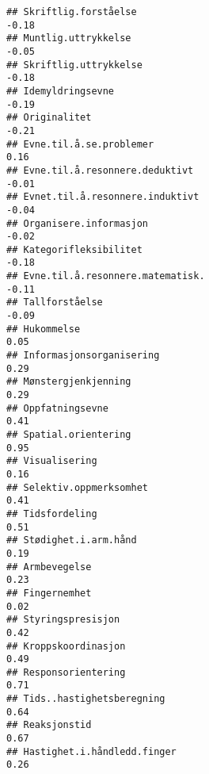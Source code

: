 \documentclass[
]{article}
\begin{document}
\begin{verbatim}
## Skriftlig.forståelse                                                             -0.18
## Muntlig.uttrykkelse                                                              -0.05
## Skriftlig.uttrykkelse                                                            -0.18
## Idemyldringsevne                                                                 -0.19
## Originalitet                                                                     -0.21
## Evne.til.å.se.problemer                                                           0.16
## Evne.til.å.resonnere.deduktivt                                                   -0.01
## Evnet.til.å.resonnere.induktivt                                                  -0.04
## Organisere.informasjon                                                           -0.02
## Kategorifleksibilitet                                                            -0.18
## Evne.til.å.resonnere.matematisk.                                                 -0.11
## Tallforståelse                                                                   -0.09
## Hukommelse                                                                        0.05
## Informasjonsorganisering                                                          0.29
## Mønstergjenkjenning                                                               0.29
## Oppfatningsevne                                                                   0.41
## Spatial.orientering                                                               0.95
## Visualisering                                                                     0.16
## Selektiv.oppmerksomhet                                                            0.41
## Tidsfordeling                                                                     0.51
## Stødighet.i.arm.hånd                                                              0.19
## Armbevegelse                                                                      0.23
## Fingernemhet                                                                      0.02
## Styringspresisjon                                                                 0.42
## Kroppskoordinasjon                                                                0.49
## Responsorientering                                                                0.71
## Tids..hastighetsberegning                                                         0.64
## Reaksjonstid                                                                      0.67
## Hastighet.i.håndledd.finger                                                       0.26

\end{verbatim}
\end{document}
